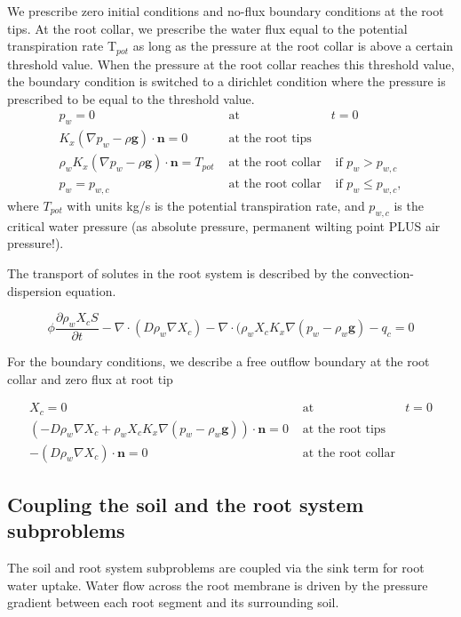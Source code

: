We prescribe zero initial conditions and no-flux boundary conditions
at the root tips. At the root collar, we prescribe the water flux
equal to the potential transpiration rate T$_{pot}$ as long as the
pressure at the root collar is above a certain threshold value. When
the pressure at the root collar reaches this threshold value, the
boundary condition is switched to a dirichlet condition where the
pressure is prescribed to be equal to the threshold value. 
\begin{eqnarray}
p_{w}=0 & \text{ at } & t=0\\
K_{x}\left(\nabla p_{w}-\rho\boldsymbol{g}\right) \cdot \mathbf{n}=0 & \text{ at the root tips}\\
\rho_w K_{x}\left(\nabla p_{w}-\rho\boldsymbol{g}\right)\cdot \mathbf{n}=T_{pot} & \text{ at the root collar} & \text{ if }p_{w}>p_{w,c}\\
p_{w}=p_{w,c} & \text{ at the root collar} & \text{ if }p_{w}\le p_{w,c},
\end{eqnarray}
where $T_{pot}$ with units kg/s is the potential transpiration rate, and $p_{w,c}$
is the critical water pressure (as absolute pressure, permanent wilting
point PLUS air pressure!).

The transport of solutes in the root system is described by the convection-dispersion equation.

\[
\phi\frac{\partial\rho_w X_{c}S}{\partial t}-\nabla \cdot (D\rho_w\nabla X_{c})-\nabla \cdot (\rho_w X_{c}K_{x}\nabla (p_{w}-\rho_w \mathbf{g})-q_{c}=0
\]

For the boundary conditions, we describe a free outflow boundary at the root collar and zero flux at root tip

\begin{eqnarray}
X_{c}=0 & \text{ at } & t=0\\
(-D\rho_w\nabla X_{c}+\rho_w X_{c}K_{x}\nabla (p_{w}-\rho_w \mathbf{g}))\cdot \mathbf{n} = 0 & \text{ at the root tips}\\
-(D\rho_w\nabla X_{c})\cdot \mathbf{n} = 0 & \text{ at the root collar}
\end{eqnarray}


\subsection*{Coupling the soil and the root system subproblems}

The soil and root system subproblems are coupled via the sink term
for root water uptake. Water flow across the root membrane is driven
by the pressure gradient between each root segment and its surrounding
soil.

